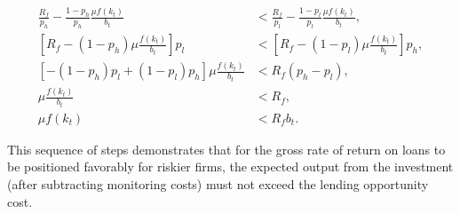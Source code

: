 \documentclass[12pt]{report}
\begin{document}
\begin{align*}
    \frac{R_f}{p_h}  -\frac{1 - p_h}{p_h}\frac{\mu f(k_t)}{b_t} &< \frac{R_f}{p_l} - \frac{1 - p_l}{p_l}\frac{\mu f(k_t)}{b_t}, \\
    \left[R_f - (1 - p_h) \mu \frac{f(k_t)}{b_t}\right] p_l &< \left[R_f - (1 - p_l) \mu \frac{f(k_t)}{b_t}\right] p_h,\\
    \left[-(1 - p_h)p_l + (1 - p_l)p_h\right] \mu \frac{f(k_t)}{b_t} &< R_f (p_h - p_l),\\
    \mu \frac{f(k_t)}{b_t} &< R_f,\\
    \mu f(k_t) &< R_f b_t.
\end{align*}

This sequence of steps demonstrates that for the gross rate of return on loans to be positioned favorably for riskier firms,
the expected output from the investment (after subtracting monitoring costs) must not exceed the lending opportunity
cost.
\end{document}
